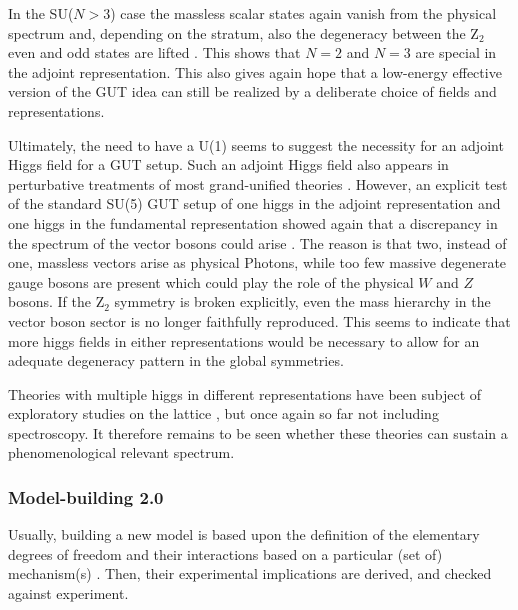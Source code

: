 \documentclass[final,twoside,12pt]{article}
\newcommand*{\1}{1\!\!\!\bot}
\begin{document}
In the SU($N>3$) case the massless scalar states again vanish from the physical spectrum and, depending on the stratum, also the degeneracy between the Z$_2$ even and odd states are lifted \cite{Maas:2017xzh}. This shows that $N=2$ and $N=3$ are special in the adjoint representation. This also gives again hope that a low-energy effective version of the GUT idea can still be realized by a deliberate choice of fields and representations.

Ultimately, the need to have a U(1) seems to suggest the necessity for an adjoint Higgs field for a GUT setup. Such an adjoint Higgs field also appears in perturbative treatments of most grand-unified theories \cite{Bohm:2001yx,Langacker:1980js}. However, an explicit test of the standard SU(5) GUT setup of one higgs in the adjoint representation and one higgs in the fundamental representation \cite{Bohm:2001yx,Langacker:1980js} showed again that a discrepancy in the spectrum of the vector bosons could arise \cite{Maas:2017xzh,Pedro:2016hnd}. The reason is that two, instead of one, massless vectors arise as physical Photons, while too few massive degenerate gauge bosons are present which could play the role of the physical $W$ and $Z$ bosons. If the Z$_2$ symmetry is broken explicitly, even the mass hierarchy in the vector boson sector is no longer faithfully reproduced. This seems to indicate that more higgs fields in either representations would be necessary to allow for an adequate degeneracy pattern in the global symmetries.

Theories with multiple higgs in different representations have been subject of exploratory studies on the lattice \cite{Greensite:2008ss}, but once again so far not including spectroscopy. It therefore remains to be seen whether these theories can sustain a phenomenological relevant spectrum.

\subsubsection{Model-building 2.0}\label{sss:model}

Usually, building a new model is based upon the definition of the elementary degrees of freedom and their interactions based on a particular (set of) mechanism(s) \cite{Morrissey:2009tf}. Then, their experimental implications are derived, and checked against experiment. 
\end{document}
